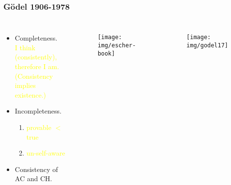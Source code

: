 \documentclass[UTF8,aspectratio=43,11pt,colorlinks,compress,openany]{beamer}%
\begin{document}
\begin{frame}\frametitle{G\"odel 1906-1978}
\centerline{}
	\begin{columns}
			\begin{itemize}
				\item Completeness.\\
				\textcolor{yellow}{\small I think (consistently), therefore I am.\\ (Consistency implies existence.)}
				\item Incompleteness.
				\begin{enumerate}
					\item \textcolor{yellow}{\small provable $<$ true}
					\item \textcolor{yellow}{\small un-self-aware}
				\end{enumerate}
				\item Consistency of AC and CH.
			\end{itemize}\vspace{-7pt}
			\begin{figure}
				\texttt{[image: img/escher-book]}
			\end{figure}
			\begin{figure}
				\texttt{[image: img/godel17]}
			\end{figure}
	\end{columns}
\end{frame}
\end{document}
